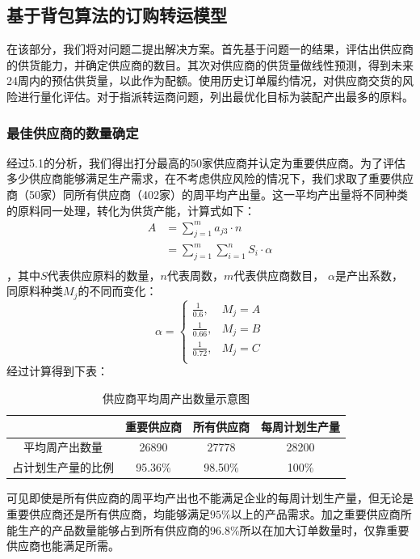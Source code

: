 \documentclass{my_paper}
\begin{document}
\subsection{基于背包算法的订购转运模型}
在该部分，我们将对问题二提出解决方案。首先基于问题一的结果，评估出供应商的供货能力，并确定供应商的数目。其次对供应商的供货量做线性预测，得到未来24周内的预估供货量，以此作为配额。使用历史订单履约情况，对供应商交货的风险进行量化评估。对于指派转运商问题，列出最优化目标为装配产出最多的原料。
\subsubsection{最佳供应商的数量确定}
经过5.1的分析，我们得出打分最高的50家供应商并认定为重要供应商。为了评估多少供应商能够满足生产需求，在不考虑供应风险的情况下，我们求取了重要供应商（50家）同所有供应商（402家）的周平均产出量。这一平均产出量将不同种类的原料同一处理，转化为供货产能，计算式如下：
\begin{equation}
    \begin{aligned}
        A &= \sum\limits^m_{j=1} a_{j3} \cdot n\\
          &= \sum\limits^m_{j=1}\sum\limits^n_{i=1} S_i\cdot \alpha\\
    \end{aligned}
\label{A}
\end{equation}
，其中$S$代表供应原料的数量，$n$代表周数，$m$代表供应商数目，
$\alpha$是产出系数，同原料种类$M_j$的不同而变化：
    $$\alpha=\begin{cases}
        \frac{1}{0.6} ,& M_j=A\\
        \frac{1}{0.66} ,& M_j=B\\
        \frac{1}{0.72} ,& M_j=C\\
    \end{cases}$$
经过计算得到下表：
\begin{table}[ht]
\centering
\caption{供应商平均周产出数量示意图}
\begin{tabular}{c|ccc}
\toprule
& 重要供应商   & 所有供应商   & 每周计划生产量 \\\midrule
平均周产出数量      & 26890   & 27778   & 28200   \\
占计划生产量的比例 & 95.36\% & 98.50\% & 100\%   \\
\bottomrule
  \end{tabular}
\label{label}
  \end{table}

可见即使是所有供应商的周平均产出也不能满足企业的每周计划生产量，但无论是重要供应商还是所有供应商，均能够满足$95\%$以上的产品需求。加之重要供应商所能生产的产品数量能够占到所有供应商的$96.8\%$所以在加大订单数量时，仅靠重要供应商也能满足所需。
\end{document}
